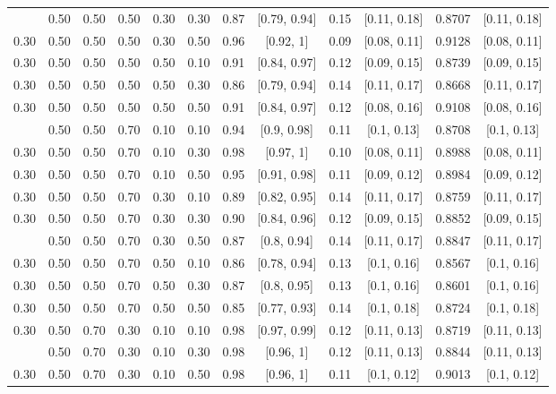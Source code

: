 \documentclass[
  11pt,
]{article}
\begin{document}
\begin{landscape}
\begin{ThreePartTable}
\begin{longtable}[t]{cccccccccccc}
\addlinespace
0.30 & 0.50 & 0.50 & 0.50 & 0.30 & 0.30 & 0.87 & {}[0.79, 0.94] & 0.15 & {}[0.11, 0.18] & 0.8707 & {}[0.11, 0.18]\\
0.30 & 0.50 & 0.50 & 0.50 & 0.30 & 0.50 & 0.96 & {}[0.92, 1] & 0.09 & {}[0.08, 0.11] & 0.9128 & {}[0.08, 0.11]\\
0.30 & 0.50 & 0.50 & 0.50 & 0.50 & 0.10 & 0.91 & {}[0.84, 0.97] & 0.12 & {}[0.09, 0.15] & 0.8739 & {}[0.09, 0.15]\\
0.30 & 0.50 & 0.50 & 0.50 & 0.50 & 0.30 & 0.86 & {}[0.79, 0.94] & 0.14 & {}[0.11, 0.17] & 0.8668 & {}[0.11, 0.17]\\
0.30 & 0.50 & 0.50 & 0.50 & 0.50 & 0.50 & 0.91 & {}[0.84, 0.97] & 0.12 & {}[0.08, 0.16] & 0.9108 & {}[0.08, 0.16]\\
\addlinespace
0.30 & 0.50 & 0.50 & 0.70 & 0.10 & 0.10 & 0.94 & {}[0.9, 0.98] & 0.11 & {}[0.1, 0.13] & 0.8708 & {}[0.1, 0.13]\\
0.30 & 0.50 & 0.50 & 0.70 & 0.10 & 0.30 & 0.98 & {}[0.97, 1] & 0.10 & {}[0.08, 0.11] & 0.8988 & {}[0.08, 0.11]\\
0.30 & 0.50 & 0.50 & 0.70 & 0.10 & 0.50 & 0.95 & {}[0.91, 0.98] & 0.11 & {}[0.09, 0.12] & 0.8984 & {}[0.09, 0.12]\\
0.30 & 0.50 & 0.50 & 0.70 & 0.30 & 0.10 & 0.89 & {}[0.82, 0.95] & 0.14 & {}[0.11, 0.17] & 0.8759 & {}[0.11, 0.17]\\
0.30 & 0.50 & 0.50 & 0.70 & 0.30 & 0.30 & 0.90 & {}[0.84, 0.96] & 0.12 & {}[0.09, 0.15] & 0.8852 & {}[0.09, 0.15]\\
\addlinespace
0.30 & 0.50 & 0.50 & 0.70 & 0.30 & 0.50 & 0.87 & {}[0.8, 0.94] & 0.14 & {}[0.11, 0.17] & 0.8847 & {}[0.11, 0.17]\\
0.30 & 0.50 & 0.50 & 0.70 & 0.50 & 0.10 & 0.86 & {}[0.78, 0.94] & 0.13 & {}[0.1, 0.16] & 0.8567 & {}[0.1, 0.16]\\
0.30 & 0.50 & 0.50 & 0.70 & 0.50 & 0.30 & 0.87 & {}[0.8, 0.95] & 0.13 & {}[0.1, 0.16] & 0.8601 & {}[0.1, 0.16]\\
0.30 & 0.50 & 0.50 & 0.70 & 0.50 & 0.50 & 0.85 & {}[0.77, 0.93] & 0.14 & {}[0.1, 0.18] & 0.8724 & {}[0.1, 0.18]\\
0.30 & 0.50 & 0.70 & 0.30 & 0.10 & 0.10 & 0.98 & {}[0.97, 0.99] & 0.12 & {}[0.11, 0.13] & 0.8719 & {}[0.11, 0.13]\\
\addlinespace
0.30 & 0.50 & 0.70 & 0.30 & 0.10 & 0.30 & 0.98 & {}[0.96, 1] & 0.12 & {}[0.11, 0.13] & 0.8844 & {}[0.11, 0.13]\\
0.30 & 0.50 & 0.70 & 0.30 & 0.10 & 0.50 & 0.98 & {}[0.96, 1] & 0.11 & {}[0.1, 0.12] & 0.9013 & {}[0.1, 0.12]\\

\end{longtable}
\end{ThreePartTable}
\end{landscape}
\end{document}
